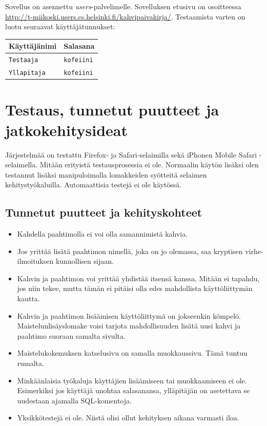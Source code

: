 \documentclass[a4paper,titlepage]{article}
\begin{document}
Sovellus on asennettu \emph{users}-palvelimelle. Sovelluksen etusivu on osoitteessa \url{http://t-miikoski.users.cs.helsinki.fi/kahvipaivakirja/}. Testaamista varten on luotu seuraavat käyttäjätunnukset:

\begin{center}
\begin{tabularx}{\textwidth}{|X|X|}
\hline
Käyttäjänimi & Salasana \\
\hline
\texttt{Testaaja} & \texttt{kofeiini} \\
\texttt{Yllapitaja} & \texttt{kofeiini} \\
\hline
\end{tabularx}
\end{center}


\section{Testaus, tunnetut puutteet ja jatkokehitysideat}

Järjestelmää on testattu Firefox- ja Safari-selaimilla sekä iPhonen
Mobile Safari -selaimella. Mitään erityistä testausprosessia ei
ole. Normaalin käytön lisäksi olen testannut lisäksi manipuloimalla
lomakkeiden syötteitä selaimen kehitystyökaluilla. Automaattisia
testejä ei ole käytössä.

\subsection{Tunnetut puutteet ja kehityskohteet}

\begin{itemize}
\item Kahdella paahtimolla ei voi olla samannimistä kahvia.
\item Jos yrittää lisätä paahtimon nimellä, joka on jo olemassa, saa
  kryptisen virhe-ilmoituksen kunnollisen sijaan.
\item Kahvin ja paahtimon voi yrittää yhdistää itsensä kanssa. Mitään
  ei tapahdu, jos niin tekee, mutta tämän ei pitäisi olla edes
  mahdollista käyttöliittymän kautta.
\item Kahvin ja paahtimon lisäämisen käyttöliittymä on jokseenkin
  kömpelö. Maistelunlisäyslomake voisi tarjota mahdollisuuden lisätä
  uusi kahvi ja paahtimo suoraan samalta sivulta.
\item Maistelukokemuksen katselusivu on samalla muokkaussivu. Tämä
  tuntuu rumalta.
\item Minkäänlaisia työkaluja käyttäjien lisäämiseen tai muokkaamiseen
  ei ole. Esimerkiksi jos käyttäjä unohtaa salasanansa, ylläpitäjän on
  asetettava se uudestaan ajamalla SQL-komentoja.
\item Yksikkötestejä ei ole. Niistä olisi ollut kehityksen aikana
  varmasti iloa.
\end{itemize}
\end{document}
